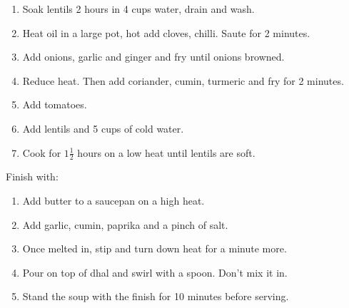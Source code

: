 \documentclass[11pt,a4paper]{article}
\begin{document}
\begin{enumerate}
  \item Soak lentils 2 hours in 4 cups water, drain and wash.
  \item Heat oil in a large pot, hot add cloves, chilli. Saute for 2 minutes.
  \item Add onions, garlic and ginger and fry until onions browned.
  \item Reduce heat. Then add coriander, cumin, turmeric and fry for 2 minutes.
  \item Add tomatoes.
  \item Add lentils and 5 cups of cold water.
  \item Cook for $1 \frac {1}{2}$ hours on a low heat until lentils are soft.
\end{enumerate}

Finish with:

\begin{enumerate}
  \item Add butter to a saucepan on a high heat.
  \item Add garlic, cumin, paprika and a pinch of salt.
  \item Once melted in, stip and turn down heat for a minute more.
  \item Pour on top of dhal and swirl with a spoon. Don't mix it in.
  \item Stand the soup with the finish for 10 minutes before serving.
\end{enumerate}
\end{document}
